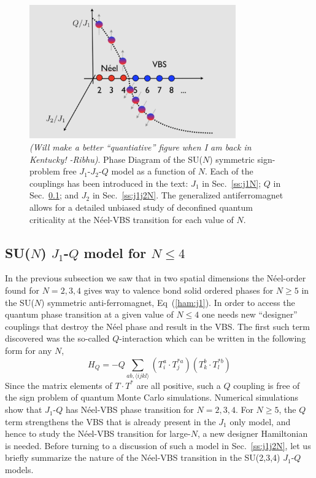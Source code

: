 \documentclass[aps,prb,groupedaddress,twocolumn]{revtex4}
\begin{document}
\begin{figure}
\includegraphics[width=3.5in]{pdj1j2q.pdf}
  \caption{ \label{fig:pdj1j2q} {\em (Will make a better ``quantiative''
      figure when  I am back in Kentucky! -Ribhu)}. Phase Diagram of the
    SU($N$) symmetric sign-problem free
    $J_1$-$J_2$-$Q$ model as a function of $N$. Each of the couplings has been introduced
    in the text: $J_1$ in Sec.~\ref{ss:j1N}; $Q$ in Sec.~\ref{ss:jqN};
  and $J_2$ in Sec.~\ref{ss:j1j2N}. The generalized antiferromagnet
  allows for a detailed unbiased study of deconfined quantum
  criticality at the N\'eel-VBS transition for each value of $N$. }
\end{figure}


\subsection{SU($N$) $J_1$-$Q$ model for $N\leq 4$}
\label{ss:jqN}
In the previous subsection we saw that in two spatial dimensions the
N\'eel-order found for $N=2,3,4$ gives way to valence bond solid
ordered phases for $N\geq 5$ in the SU($N$) symmetric
anti-ferromagnet, Eq~(\ref{ham:j1}). In order to access the quantum
phase transition at a given value of $N\leq 4$ one needs new
``designer'' couplings that
destroy the N\'eel phase and result in the VBS. The first such term discovered was
the so-called $Q$-interaction which can be written in the following
form for any $N$,
\begin{equation}
H_{Q} = - Q \sum_{ab,\langle ijkl \rangle} \left ( T^a_i\cdot
  T^{*a}_j\right ) \left ( T^b_k\cdot T^{*b}_l \right )
\end{equation}
Since the matrix elements of $T\cdot T^*$ are all positive, such a $Q$
coupling is free of the sign problem of quantum Monte Carlo
simulations. Numerical simulations show that $J_1$-$Q$ has N\'eel-VBS
phase transition for $N=2,3,4$. For $N\geq 5$, the $Q$ term strengthens
the VBS that is already present in the $J_1$ only model, and hence to
study the N\'eel-VBS transition for large-$N$, a new designer
Hamiltonian is needed. Before turning to a discussion of such a model in
Sec.~\ref{ss:j1j2N}, let us briefly summarize the nature of the
N\'eel-VBS transition in the SU(2,3,4) $J_1$-$Q$ models.
\end{document}
